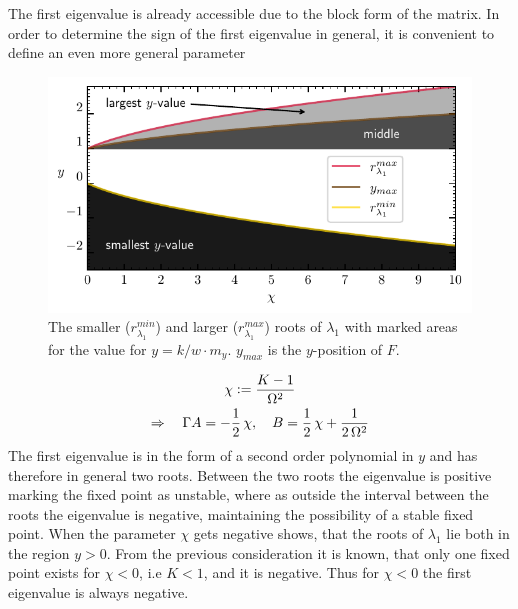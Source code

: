 The first eigenvalue is already accessible due to the block form of the matrix. In order to determine the sign of the first eigenvalue in general, it is convenient to define an even more general parameter
\begin{figure}[H]
    \centering
    \includegraphics{pictures/sign_of_ev1_streched.pdf}
    \caption{The smaller ($r_{\lambda_1}^{min}$) and larger ($r_{\lambda_1}^{max}$) roots of $\lambda_1$ with marked areas for the value for ${y}=k/w\cdot m_y$. ${y}_{max}$ is the ${y}$-position of $F$.}
    \label{fig:sign_lam1}
\end{figure}
\begin{gather*}
    \chi\vcentcolon=\frac{K-1}{\Omega^2}\\
    \Rightarrow\quad\Gamma A=-\half\,\chi,\quad
    B=\half\,\chi+\frac{1}{2\,\Omega^2}%
\end{gather*}
The first eigenvalue is in the form of a second order polynomial in $y$ and has therefore in general two roots. Between the two roots the eigenvalue is positive marking the fixed point as unstable, where as outside the interval between the roots the eigenvalue is negative, maintaining the possibility of a stable fixed point. When the parameter $\chi$ gets negative  shows, that the roots of $\lambda_1$ lie both in the region $y>0$. From the previous consideration it is known, that only one fixed point exists for $\chi<0$, i.e $K<1$, and it is negative. Thus for $\chi<0$ the first eigenvalue is always negative.\\\\
